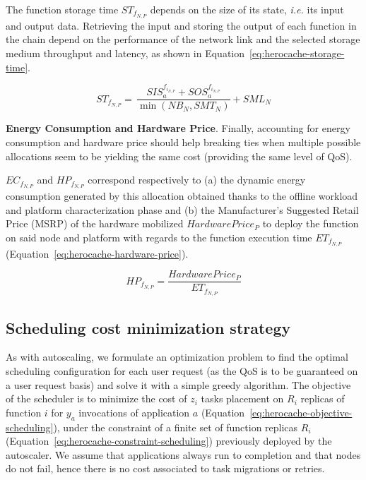 The function storage time ${ST}_{{f}_{N, P}}$ depends on the size of its state, \textit{i.e.} its input and output data. Retrieving the input and storing the output of each function in the chain depend on the performance of the network link and the selected storage medium throughput and latency, as shown in Equation~\ref{eq:herocache-storage-time}.

\begin{equation}
    {ST}_{{f}_{N, P}} = \, \frac{SIS_{a}^{f_{i_{N, P}}} + SOS_{a}^{f_{i_{N, P}}}}{\min (NB_{N}, SMT_{N})} + SML_{N}
\label{eq:herocache-storage-time}
\end{equation}

\textbf{Energy Consumption and Hardware Price}. Finally, accounting for energy consumption and hardware price should help breaking ties when multiple possible allocations seem to be yielding the same cost (providing the same level of QoS).

${EC}_{{f}_{N, P}}$ and ${HP}_{{f}_{N, P}}$ correspond respectively to (a) the dynamic energy consumption generated by this allocation obtained thanks to the offline workload and platform characterization phase and (b) the Manufacturer's Suggested Retail Price (MSRP) of the hardware mobilized $Hardware Price_{P}$ to deploy the function on said node and platform with regards to the function execution time $ET_{{f}_{N, P}}$ (Equation~\ref{eq:herocache-hardware-price}).

\begin{equation}
    {HP}_{{f}_{N, P}} = \frac{Hardware Price_{P}}{ET_{{f}_{N, P}}}
\label{eq:herocache-hardware-price}
\end{equation}

\subsection{Scheduling cost minimization strategy}

As with autoscaling, we formulate an optimization problem to find the optimal scheduling configuration for each user request (as the QoS is to be guaranteed on a user request basis) and solve it with a simple greedy algorithm. The objective of the scheduler is to minimize the cost of $z_i$ tasks placement on $R_i$ replicas of function $i$ for $y_a$ invocations of application $a$ (Equation~\ref{eq:herocache-objective-scheduling}), under the constraint of a finite set of function replicas $R_{i}$ (Equation~\ref{eq:herocache-constraint-scheduling}) previously deployed by the autoscaler.  %
We assume that applications always run to completion and that nodes do not fail, hence there is no cost associated to task migrations or retries.

